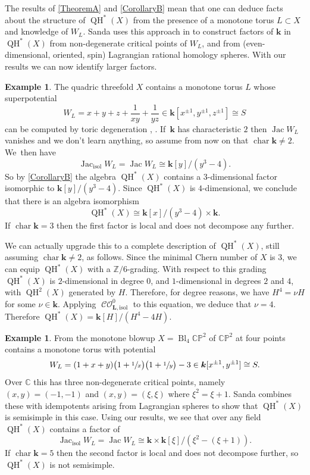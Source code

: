 \documentclass[JEP,XML,SOM,Unicode,NoEqCountersInSection,NoFloatCountersInSection,published]{cedram}
\theoremstyle{definition}
\newtheorem{example}[theorem]{Example}
\newcommand{\CC}{\mathbb{C}}
\newcommand{\ZZ}{\mathbb{Z}}
\newcommand{\PP}{\mathbb{P}}
\newcommand{\kk}{{\boldsymbol{k}}}
\newcommand{\bL}{{\boldsymbol{L}}}
\newcommand{\isol}{\mathrm{isol}}
\newcommand{\Char}{\operatorname{char}}
\newcommand{\CO}{\operatorname{\mathcal{CO}}}
\newcommand{\QH}{\operatorname{QH}}
\newcommand{\Jac}{\operatorname{Jac}}
\newcommand{\Jacisol}{\operatorname{Jac}_\isol}
\newcommand{\COisol}{\CO^0_{\bL, \isol}}
\begin{document}
The results of \cref{TheoremA} and \cref{CorollaryB} mean that one can deduce facts about the structure of $\QH^*(X)$ from the presence of a monotone torus $L \subset X$ and knowledge of $W_L$. Sanda uses this approach in \cite{Sanda} to construct factors of $\kk$ in $\QH^*(X)$ from non-degenerate critical points of $W_L$, and from (even-dimensional, oriented, spin) Lagrangian rational homology spheres. With our results we can now identify larger factors.

\begin{example}
\label{exQuadricQH}
The quadric threefold $X$ contains a monotone torus $L$ whose super\-potential
\[
W_L = x+y+z+\frac{1}{xy}+\frac{1}{yz} \in \kk[x^{\pm1}, y^{\pm1}, z^{\pm1}] \cong S
\]
can be computed by toric degeneration \cite[Rem.\,7.1.3]{EvansLekiliGeneration}, \cite[Th.\,1]{NishinouNoharaUeda}. If~$\kk$ has characteristic $2$ then $\Jac W_L$ vanishes and we don't learn anything, so assume from now on that $\Char \kk \neq 2$. We~then have
\[
\Jacisol W_L = \Jac W_L \cong \kk[y]/(y^3-4).
\]
So by \cref{CorollaryB} the algebra $\QH^*(X)$ contains a $3$-dimensional factor isomorphic to $\kk[y]/(y^3-4)$. Since $\QH^*(X)$ is $4$-dimensional, we conclude that there is an algebra isomorphism
\[
\QH^*(X) \cong \kk[x] / (y^3 - 4) \times \kk.
\]
If $\Char \kk = 3$ then the first factor is local and does not decompose any further.

We can actually upgrade this to a complete description of $\QH^*(X)$, still assuming $\Char \kk \neq 2$, as follows. Since the minimal Chern number of $X$ is $3$, we can equip $\QH^*(X)$ with a $\ZZ/6$-grading. With respect to this grading $\QH^*(X)$ is $2$-dimensional in degree $0$, and $1$-dimensional in degrees $2$ and $4$, with $\QH^2(X)$ generated by $H$. Therefore, for degree reasons, we have $H^4 = \nu H$ for some $\nu \in \kk$. Applying $\COisol$ to this equation, we deduce that $\nu = 4$. Therefore $\QH^*(X) = \kk[H] / (H^4 - 4H)$.
\end{example}

\begin{example}
\label{ex4Blowup}
From \cite[Prop.\,4.22]{PascaleffTonkonog} the monotone blowup $X = \operatorname{Bl}_4 \CC\PP^2$ of $\CC\PP^2$ at four points contains a monotone torus with potential
\[
W_L = (1+x+y)\big( 1+\sfrac{1}{x}\big) \big( 1+ \sfrac{1}{y} \big) - 3 \in \kk[x^{\pm1}, y^{\pm1}] \cong S.
\]
Over $\CC$ this has three non-degenerate critical points, namely $(x, y) = (-1, -1)$ and $(x, y) = (\xi, \xi)$ where $\xi^2 = \xi + 1$. Sanda \cite{Sanda} combines these with idempotents arising from Lagrangian spheres to show that $\QH^*(X)$ is semisimple in this case. Using our results, we see that over any field $\QH^*(X)$ contains a factor of
\[
\Jacisol W_L = \Jac W_L \cong \kk \times \kk[\xi] / (\xi^2-(\xi+1)).
\]
If $\Char \kk = 5$ then the second factor is local and does not decompose further, so~$\QH^*(X)$ is not semisimple.
\end{example}
\end{document}
